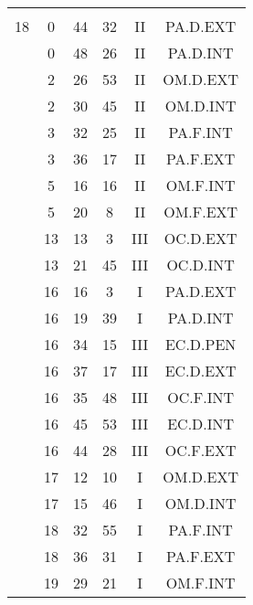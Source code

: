 \documentclass[12pt, a4paper]{article}
\begin{document}
\begin{multicols}{3}
{\begin{tabular}{c c c c c c}
	 	 	 	 & & & & & \\%
	 	 	 	18 & 0 & 44 & 32 & II & PA.D.EXT\\%
	 	 	 	 & 0 & 48 & 26 & II & PA.D.INT\\%
	 	 	 	 & 2 & 26 & 53 & II & OM.D.EXT\\%
	 	 	 	 & 2 & 30 & 45 & II & OM.D.INT\\%
	 	 	 	 & 3 & 32 & 25 & II & PA.F.INT\\%
	 	 	 	 & 3 & 36 & 17 & II & PA.F.EXT\\%
	 	 	 	 & 5 & 16 & 16 & II & OM.F.INT\\%
	 	 	 	 & 5 & 20 & 8 & II & OM.F.EXT\\%
	 	 	 	 & 13 & 13 & 3 & III & OC.D.EXT\\%
	 	 	 	 & 13 & 21 & 45 & III & OC.D.INT\\%
	 	 	 	 & 16 & 16 & 3 & I & PA.D.EXT\\%
	 	 	 	 & 16 & 19 & 39 & I & PA.D.INT\\%
	 	 	 	 & 16 & 34 & 15 & III & EC.D.PEN\\%
	 	 	 	 & 16 & 37 & 17 & III & EC.D.EXT\\%
	 	 	 	 & 16 & 35 & 48 & III & OC.F.INT\\%
	 	 	 	 & 16 & 45 & 53 & III & EC.D.INT\\%
	 	 	 	 & 16 & 44 & 28 & III & OC.F.EXT\\%
	 	 	 	 & 17 & 12 & 10 & I & OM.D.EXT\\%
	 	 	 	 & 17 & 15 & 46 & I & OM.D.INT\\%
	 	 	 	 & 18 & 32 & 55 & I & PA.F.INT\\%
	 	 	 	 & 18 & 36 & 31 & I & PA.F.EXT\\%
	 	 	 	 & 19 & 29 & 21 & I & OM.F.INT\\%

\end{tabular}}
\end{multicols}
\end{document}
